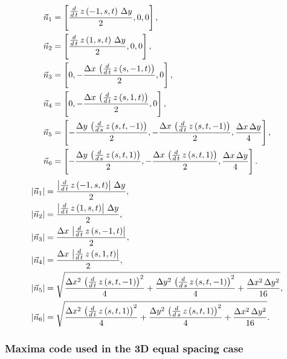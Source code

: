 \documentclass[11pt]{article}
\begin{document}
\begin{align*}
 \vec n_{1} & = \left[ \frac{\frac{d}{d\,t}\,z\left(-1 , s , t\right)\,\Delta y}{2} , 0 , 0 \right] , \\
 \vec n_{2} & = \left[ \frac{\frac{d}{d\,t}\,z\left(1 , s , t\right)\,\Delta y}{2} , 0 , 0 \right] , \\
 \vec n_{3} & = \left[ 0 , -\frac{\Delta x\,\left(\frac{d}{d\,t}\,z\left(s , -1 , t\right)\right)}{2} , 0 \right] , \\
 \vec n_{4} & = \left[ 0 , -\frac{\Delta x\,\left(\frac{d}{d\,t}\,z\left(s , 1 , t\right)\right)}{2} , 0 \right] , \\
 \vec n_{5} & = \left[ -\frac{\Delta y\,\left(\frac{d}{d\,s}\,z\left(s , t , -1\right)\right)}{2} , -\frac{\Delta x\,\left(\frac{d}{d\,t}\,z\left(s , t , -1\right)\right)}{2} , \frac{\Delta x\,\Delta y}{4} \right] , \\
 \vec n_{6} & = \left[ -\frac{\Delta y\,\left(\frac{d}{d\,s}\,z\left(s , t , 1\right)\right)}{2} , -\frac{\Delta x\,\left(\frac{d}{d\,t}\,z\left(s , t , 1\right)\right)}{2} , \frac{\Delta x\,\Delta y}{4} \right] . \\
\end{align*}
\begin{align*}
 \left| \vec n_{1}\right|  & = \frac{\left| \frac{d}{d\,t}\,z\left(-1 , s , t\right)\right| \,\Delta y}{2}, \\
 \left| \vec n_{2}\right|  & = \frac{\left| \frac{d}{d\,t}\,z\left(1 , s , t\right)\right| \,\Delta y}{2}, \\
 \left| \vec n_{3}\right|  & = \frac{\Delta x\,\left| \frac{d}{d\,t}\,z\left(s , -1 , t\right)\right| }{2}, \\
 \left| \vec n_{4}\right|  & = \frac{\Delta x\,\left| \frac{d}{d\,t}\,z\left(s , 1 , t\right)\right| }{2}, \\
 \left| \vec n_{5}\right|  & = \sqrt{\frac{\Delta x^2\,\left(\frac{d}{d\,t}\,z\left(s , t , -1\right)\right)^2}{4}+\frac{\Delta y^2\,\left(\frac{d}{d\,s}\,z\left(s , t , -1\right)\right)^2}{4}+\frac{\Delta x^2\,\Delta y^2}{16}}, \\
 \left| \vec n_{6}\right|  & = \sqrt{\frac{\Delta x^2\,\left(\frac{d}{d\,t}\,z\left(s , t , 1\right)\right)^2}{4}+\frac{\Delta y^2\,\left(\frac{d}{d\,s}\,z\left(s , t , 1\right)\right)^2}{4}+\frac{\Delta x^2\,\Delta y^2}{16}}. \\
\end{align*}

\subsubsection{Maxima code used in the 3D equal spacing case}
\label{sec-4-1-2}
\end{document}
